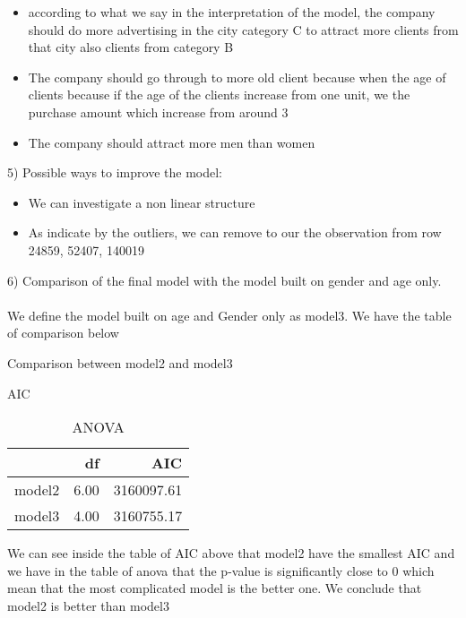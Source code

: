 \documentclass[11pt,a4paper]{article}
\begin{document}
\begin{itemize}
	\item according to what we say in the interpretation of the model, the company should do more advertising in the city category C to attract more clients from that city also clients from category B
	\item The company should go through to more old client because when the age of clients because if the age of the clients increase from one unit, we the purchase amount which increase from around 3
	\item The company should attract more men than women
\end{itemize}
5) Possible ways to improve the model:
\begin{itemize}
	\item We can investigate a non linear structure
	\item As indicate by the outliers, we can remove to our the observation from row 24859, 52407, 140019
\end{itemize}
6) Comparison of the final model with the model built on gender and age only.\\
\\We define the model built on age and Gender only as model3. We have the table of comparison below
\begin{table}[H]
	\caption{Comparison between model2 and model3}
	\begin{subtable}{.5\linewidth}
		\centering
		\caption{AIC}
		 \begin{tabular}{rrr}
		 		\hline
		 		& df & AIC \\ 
		 		\hline
		 		model2 & 6.00 & 3160097.61 \\ 
		 		model3 & 4.00 & 3160755.17 \\ 
		 		\hline
		 	\end{tabular}
	\end{subtable} %
	\begin{subtable}{.5\linewidth}
		\centering
		\caption{ANOVA}
	 	\end{subtable} 
\end{table} 
We can see inside the table of AIC above that model2 have the smallest AIC and we have in the table of anova that the p-value is significantly close to 0 which mean that the most complicated model is the better one. We conclude that model2 is better than model3 
\end{document}
